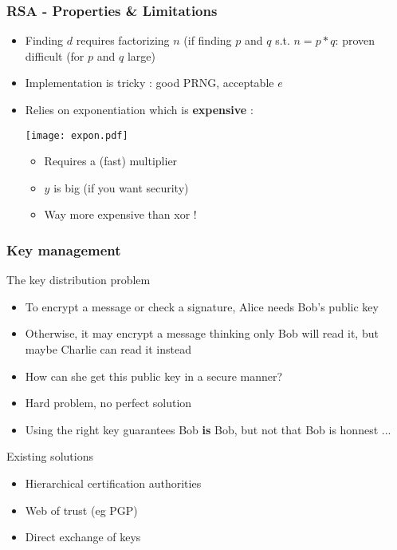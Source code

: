 \documentclass[
hyperref={pdfpagelabels=false}
,xcolor=table
]
{beamer}
\newcommand{\plus}{{\texttt{[image: plus.png]}}}
\newcommand{\minus}{{\texttt{[image: minus.png]}}}
\begin{document}
\begin{frame}
  \frametitle{RSA - Properties \& Limitations}

  \begin{itemize}
  \item[\plus] Finding $d$ requires factorizing $n$ (if finding $p$
    and $q$ s.t. $n=p*q$: proven difficult (for $p$ and $q$ large)
  \item[\minus] Implementation is tricky : good PRNG, acceptable $e$ 
  \item[\minus] Relies on exponentiation which is \textbf{expensive} :
    \begin{center}
      \texttt{[image: expon.pdf]}
    \end{center}
    \begin{itemize}
    \item Requires a (fast) multiplier
    \item $y$ is big (if you want security)
    \item Way more expensive than xor ! 
    \end{itemize}
  \end{itemize}
\end{frame}


\begin{frame}
  \frametitle{Key management}

  \begin{block}{The key distribution problem}
    \begin{itemize}
    \item To encrypt a message or check a signature, Alice needs Bob's public key
    \item Otherwise, it may encrypt a message thinking only Bob will read it, but maybe Charlie can read it instead
    \item How can she get this public key in a secure manner? 
    \item Hard problem, no perfect solution
    \item[Note: ] Using the right key guarantees Bob \textbf{is} Bob, but not that Bob is honnest ... 
    \end{itemize}
  \end{block}

  \begin{block}{Existing solutions}
    \begin{itemize}
    \item Hierarchical certification authorities
    \item Web of trust (eg PGP)
    \item Direct exchange of keys
    \end{itemize}
  \end{block}
\end{frame}
\end{document}

